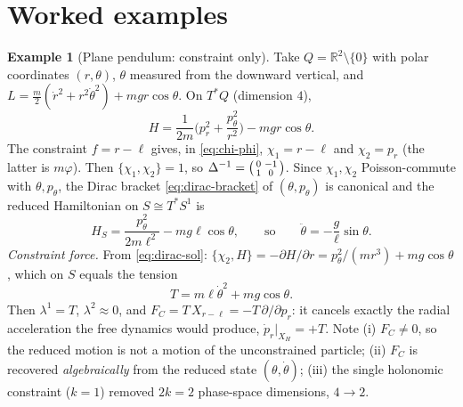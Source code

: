 \documentclass[11pt,a4paper]{article}
\numberwithin{equation}{section}
\theoremstyle{plain}
\theoremstyle{definition}
\newtheorem{example}[theorem]{Example}
\theoremstyle{remark}
\newcommand{\R}{\mathbb{R}}
\newcommand{\pb}[2]{\{#1,#2\}}
\newcommand{\weq}{\mathrel{\approx}}
\begin{document}
\section{Worked examples}\label{sec:examples}

\begin{example}[Plane pendulum: constraint only]\label{ex:pendulum}
Take $Q=\R^2\setminus\{0\}$ with polar coordinates $(r,\theta)$, $\theta$ measured from the downward vertical, and $L=\tfrac m2(\dot r^2+r^2\dot\theta^2)+mgr\cos\theta$. On $T^*Q$ (dimension $4$),
\[
H=\frac1{2m}\Big(p_r^2+\frac{p_\theta^2}{r^2}\Big)-mgr\cos\theta .
\]
The constraint $f=r-\ell$ gives, in \eqref{eq:chi-phi}, $\chi_1=r-\ell$ and $\chi_2=p_r$ (the latter is $m\varphi$). Then $\pb{\chi_1}{\chi_2}=1$, so $\Delta^{-1}=\begin{psmallmatrix}0&-1\\1&0\end{psmallmatrix}$. Since $\chi_1,\chi_2$ Poisson-commute with $\theta,p_\theta$, the Dirac bracket \eqref{eq:dirac-bracket} of $(\theta,p_\theta)$ is canonical and the reduced Hamiltonian on $S\cong T^*S^1$ is
\[
H_S=\frac{p_\theta^2}{2m\ell^2}-mg\ell\cos\theta,\qquad\text{so}\qquad \ddot\theta=-\frac g\ell\sin\theta .
\]
\emph{Constraint force.} From \eqref{eq:dirac-sol}: $\{\chi_2,H\}=-\partial H/\partial r=p_\theta^2/(mr^3)+mg\cos\theta$, which on $S$ equals the tension
\[
T=m\ell\dot\theta^2+mg\cos\theta .
\]
Then $\lambda^1=T$, $\lambda^2\weq0$, and $F_C=T\,X_{r-\ell}=-T\,\partial/\partial p_r$: it cancels exactly the radial acceleration the free dynamics would produce, $\dot p_r|_{X_H}=+T$. Note (i) $F_C\ne0$, so the reduced motion is not a motion of the unconstrained particle; (ii) $F_C$ is recovered \emph{algebraically} from the reduced state $(\theta,\dot\theta)$; (iii) the single holonomic constraint ($k=1$) removed $2k=2$ phase-space dimensions, $4\to2$.
\end{example}
\end{document}
